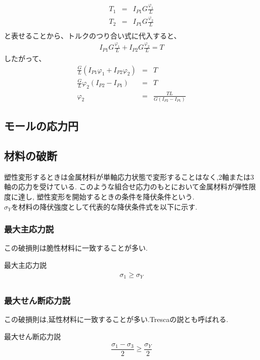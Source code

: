\documentclass[a4paper]{jsarticle}
\begin{document}
\begin{enumerate}[(1)]
          \begin{eqnarray*}
              T_1&=&I_{P1}G\frac{\varphi_1}{L}\\
              T_2&=&I_{P1}G\frac{\varphi_2}{L}\\
          \end{eqnarray*}
          と表せることから、トルクのつり合い式に代入すると、
          \begin{eqnarray*}
              I_{P1}G\frac{\varphi_1}{L}+I_{P2}G\frac{\varphi_2}{L}=T
          \end{eqnarray*}
          したがって、
          \begin{eqnarray*}
              \frac{G}{L}\left(I_{P1}\varphi_1+I_{P2}\varphi_2\right)&=&T\\
              \frac{G}{L}\varphi_2\left(I_{P2}-I_{P1}\right)&=&T\\
              \varphi_2&=&\frac{TL}{G\left(I_{P2}-I_{P1}\right)}
          \end{eqnarray*}
\end{enumerate}
\subsection{モールの応力円}
\subsection{材料の破断}
塑性変形するときは金属材料が単軸応力状態で変形することはなく,2軸または3軸の応力を受けている.
このような組合せ応力のもとにおいて金属材料が弾性限度に達し,
塑性変形を開始するときの条件を降伏条件という.\\
$\sigma_Y$を材料の降伏強度として代表的な降伏条件式を以下に示す.
\subsubsection{最大主応力説}
この破損則は脆性材料に一致することが多い.
\begin{itembox}[l]{最大主応力説}
    \begin{eqnarray*}
        \sigma_1\geq\sigma_Y\\
    \end{eqnarray*}
\end{itembox}
\subsubsection{最大せん断応力説}
この破損則は,延性材料に一致することが多い.Trescaの説とも呼ばれる.
\begin{itembox}[l]{最大せん断応力説}
    \begin{eqnarray*}
        \dfrac{\sigma_1-\sigma_3}{2}\geq\dfrac{\sigma_Y}{2}\\
    \end{eqnarray*}
\end{itembox}
\end{document}
